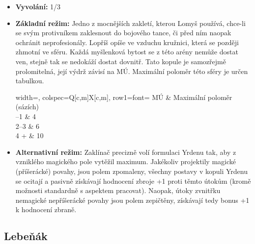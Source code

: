 \documentclass[../main.tex]{subfiles}
\begin{document}
\begin{specialita}[Yrden]
\begin{itemize}
	\item \textbf{Vyvolání:} 1/3
	\item \textbf{Základní režim:} Jedno z mocnějších zakletí, kterou Lomyš používá, chce-li se svým protivníkem zaklesnout do bojového tance, či před ním naopak ochránit neprofesionály. Lopříš opíše ve vzduchu kružnici, která se později zhmotní ve sféru. Každá myšlenková bytost se z této arény nemůže dostat ven, stejně tak se nedokáží dostat dovnitř. Tato kopule je samozřejmě prolomitelná, její výdrž závisí na MÚ. Maximální poloměr této sféry je určen tabulkou.
		\begin{center}
		\begin{tblr}{width=\linewidth, colspec={Q[c,m]X[c,m]}, row{1}={font=\bfseries}}
		\toprule
		MÚ & Maximální poloměr (sázích) \\ –1 & 4 \\
		2–3 & 6 \\
		4 + & 10 \\
		\bottomrule
		\end{tblr}
		\end{center}
	\item \textbf{Alternativní režim:} Zaklínač precizně volí formulaci Yrdenu tak, aby z vzniklého magického pole vytěžil maximum. Jakékoliv projektily magické (příšerácké) povahy, jsou polem zpomaleny, všechny postavy v kopuli Yrdenu se ocitají  a pasivně získávají hodnocení zbroje +1 proti těmto útokům (kromě možnosti standardně s aspektem pracovat). Naopak, útoky zvnitřku nemagické nepříšerácké povahy jsou polem zepičtěny, získávají tedy bonus +1 k hodnocení zbraně.
\end{itemize}
\end{specialita}


\subsection{Lebeňák}
\label{sec:lopr-lebe}
\end{document}
